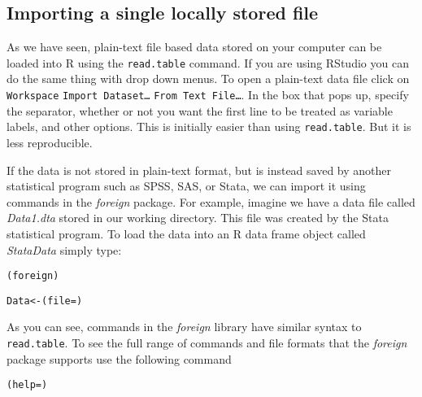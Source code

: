 \subsection{Importing a single locally stored file}

As we have seen, plain-text file based data stored on your computer can be loaded into R using the \texttt{read.table} command. If you are using RStudio you can do the same thing with drop down menus. To open a plain-text data file click on \texttt{Workspace} \textrightarrow\: \texttt{Import Dataset\ldots} \textrightarrow\: \texttt{From Text File\ldots}. In the box that pops up, specify the separator, whether or not you want the first line to be treated as variable labels, and other options. This is initially easier than using \texttt{read.table}. But it is less reproducible.

If the data is not stored in plain-text format, but is instead saved by another statistical program such as SPSS, SAS, or Stata, we can import it using commands in the \emph{foreign} package. For example, imagine we have a data file called \emph{Data1.dta} stored in our working directory. This file was created by the Stata statistical program. To load the data into an R data frame object called \emph{StataData} simply type:

\begin{knitrout}
\color{fgcolor}\begin{kframe}
\begin{alltt}
(foreign)

Data <- (file = )
\end{alltt}
\end{kframe}
\end{knitrout}


As you can see, commands in the \emph{foreign} library have similar syntax to \texttt{read.table}. To see the full range of commands and file formats that the \emph{foreign} package supports use the following command

\begin{knitrout}
\color{fgcolor}\begin{kframe}
\begin{alltt}
(help = )
\end{alltt}
\end{kframe}
\end{knitrout}


